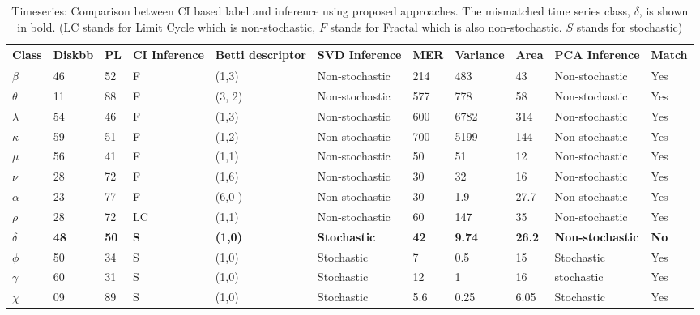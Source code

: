 \documentclass[10pt,conference]{IEEEtran}
\begin{document}
\begin{table}[t]
\caption{Timeseries: Comparison between CI based label and inference using proposed approaches. The mismatched time series class, $\delta$, is shown in bold. (LC stands for Limit Cycle \cite{Adegoke2018} which is non-stochastic, $F$ stands for Fractal which is also non-stochastic. $S$ stands for stochastic)}
\begin{center}
 \begin{tabular}{|p{0.5cm}|p{0.75cm}|p{0.75cm}|p{1cm}|p{2.5cm}|p{3cm}|p{0.75cm}|p{1cm}|p{0.5cm}|p{1.8cm}|p{0.75cm}|}
\hline
Class & Diskbb & PL  & CI \newline Inference & Betti descriptor & SVD  \newline Inference & MER & Variance & Area & PCA \newline Inference  &  Match \\
\hline
$\beta$ & 46 & 52 & F & (1,3) & Non-stochastic & 214 & 483 & 43 & Non-stochastic & Yes\\
\hline
$\theta$  & 11 &  88 & F & (3, 2) & Non-stochastic & 577 & 778 & 58&Non-stochastic  &  Yes \\
\hline
$\lambda$ &  54 & 46 & F & (1,3) & Non-stochastic & 600 & 6782 & 314 & Non-stochastic & Yes \\
\hline
$\kappa$ &  59 & 51 & F & (1,2) & Non-stochastic & 700 & 5199 & 144 & Non-stochastic &  Yes \\
\hline
$\mu$  & 56 & 41 & F & (1,1) & Non-stochastic & 50 & 51 & 12 & Non-stochastic & Yes \\
\hline
$\nu$  & 28 & 72 & F & (1,6) & Non-stochastic & 30 & 32 & 16 & Non-stochastic & Yes\\
\hline
$\alpha$  & 23 & 77& F & (6,0 ) & Non-stochastic & 30 & 1.9 & 27.7 & Non-stochastic & Yes \\
\hline
$\rho$  & 28 & 72 & LC & (1,1) &  Non-stochastic & 60 & 147 & 35 & Non-stochastic & Yes \\
\hline
\textbf{$\delta$}  & \textbf{48} & \textbf{50} &  \textbf{S} & \textbf{(1,0)}& \textbf{Stochastic}& \textbf{42} & \textbf{9.74} & \textbf{26.2} & \textbf{Non-stochastic} &  \textbf{No} \\
\hline
$\phi$  & 50 & 34 & S & (1,0)& Stochastic & 7 & 0.5 & 15 & Stochastic &  Yes \\
\hline
$\gamma$  & 60 & 31 & S & (1,0)& Stochastic & 12 & 1 & 16 & stochastic &  Yes \\
\hline
$\chi$  & 09 & 89 & S & (1,0)& Stochastic & 5.6 & 0.25 & 6.05 & Stochastic &  Yes \\
\hline
\end{tabular}
\label{tab:results}
\end{center}
\end{table}
\end{document}
